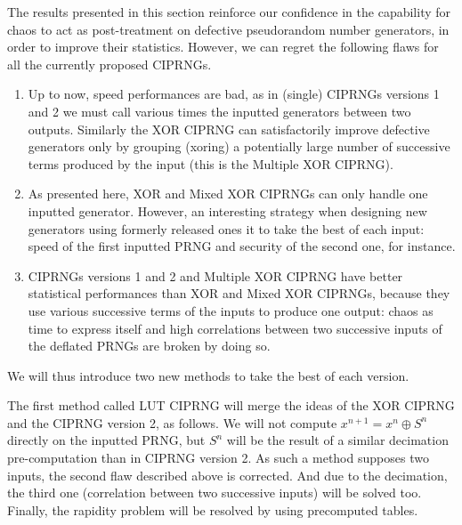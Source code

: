 

The results presented in this section reinforce our confidence in the capability
for chaos to act as post-treatment on defective pseudorandom number
generators, in order to improve their statistics. However, we can regret the 
following flaws for all the currently proposed CIPRNGs.
\begin{enumerate}
\item Up to now, speed 
performances are bad, as in (single) CIPRNGs versions 1 and 2 we must call 
various times the inputted generators between two outputs.
Similarly the XOR CIPRNG
 can satisfactorily improve defective generators only by grouping (xoring)
a potentially large number of successive terms produced by the input (this
is the Multiple XOR CIPRNG). 
\item As presented here, XOR and Mixed XOR CIPRNGs can only handle one inputted
generator. However, an interesting strategy when designing new generators using 
formerly released ones it to take the best of each input: speed of the first 
inputted PRNG and security of the second one, for instance.
\item CIPRNGs versions 1 and 2 and Multiple XOR CIPRNG have better statistical 
performances than XOR and Mixed XOR CIPRNGs, because they use various successive
terms of the inputs to produce one output: chaos as time to express itself and 
high correlations between two successive inputs of the deflated PRNGs are broken
by doing so.
\end{enumerate}

We will thus introduce two new methods to take the best of each version. 

The 
first method called LUT CIPRNG will merge the ideas of the XOR CIPRNG and the CIPRNG version 2,
as follows. We will not compute $x^{n+1} = x^n \oplus S^n$ directly on the
inputted PRNG, but $S^n$ will be the result of a similar decimation pre-computation
than in CIPRNG version 2. As such a method supposes two inputs, the second
flaw described above is corrected. And due to the decimation, the third one
(correlation between two successive inputs) will be solved too. Finally, the rapidity problem
will be resolved by using precomputed tables.

